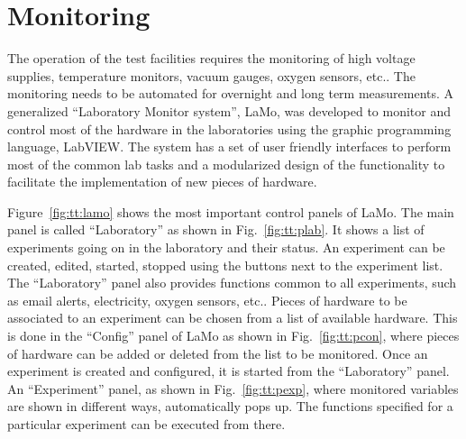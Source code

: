 \section{Monitoring} 
\label{sec:tt:lamo}
The operation of the test facilities requires the monitoring of high voltage supplies, temperature monitors, vacuum gauges, oxygen sensors, etc.. The monitoring needs to be automated for overnight and long term measurements. A generalized ``Laboratory Monitor system'', LaMo, was developed to monitor and control most of the hardware in the laboratories using the graphic programming language, LabVIEW. The system has a set of user friendly interfaces to perform most of the common lab tasks and a modularized design of the functionality to facilitate the implementation of new pieces of hardware.

Figure~\ref{fig:tt:lamo} shows the most important control panels of LaMo. The main panel is called ``Laboratory'' as shown in Fig.~\ref{fig:tt:plab}. It shows a list of experiments going on in the laboratory and their status. An experiment can be created, edited, started, stopped using the buttons next to the experiment list. The ``Laboratory'' panel also provides functions common to all experiments, such as email alerts, electricity, oxygen sensors, etc.. Pieces of hardware to be associated to an experiment can be chosen from a list of available hardware. This is done in the ``Config'' panel of LaMo as shown in Fig.~\ref{fig:tt:pcon}, where pieces of hardware can be added or deleted from the list to be monitored. Once an experiment is created and configured, it is started from the ``Laboratory'' panel. An ``Experiment'' panel, as shown in Fig.~\ref{fig:tt:pexp}, where monitored variables are shown in different ways, automatically pops up. The functions specified for a particular experiment can be executed from there.

